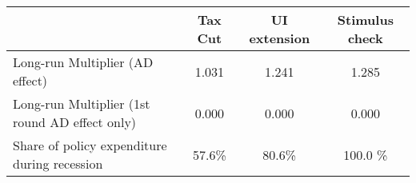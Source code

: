 \begin{tabular}{@{}lccc@{}} 
\toprule 
& Tax Cut    & UI extension    & Stimulus check    \\  \midrule 
Long-run Multiplier (AD effect) &1.031  & 1.241  & 1.285     \\ 
Long-run Multiplier (1st round AD effect only) &0.000  & 0.000  & 0.000     \\ 
Share of policy expenditure during recession &57.6\%  & 80.6\%  & 100.0 \%    \\ 
\end{tabular}  
